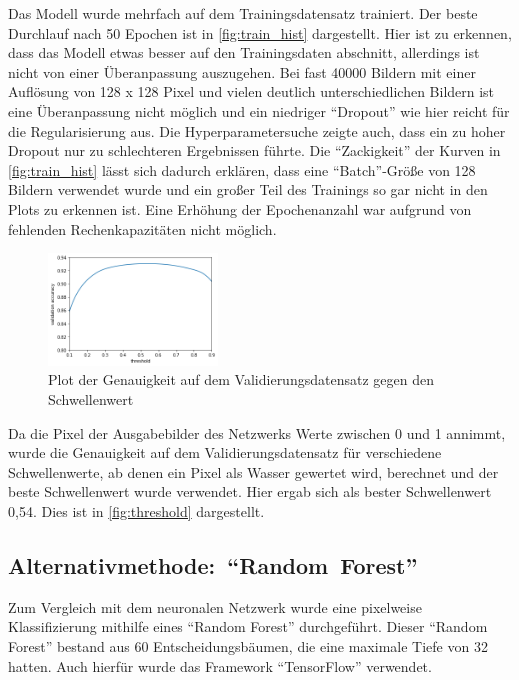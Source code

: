 Das Modell wurde mehrfach auf dem Trainingsdatensatz trainiert. 
Der beste Durchlauf nach 50 Epochen ist in \autoref{fig:train_hist} dargestellt.
Hier ist zu erkennen, dass das Modell etwas besser auf den Trainingsdaten abschnitt, allerdings ist nicht von einer Überanpassung auszugehen.
Bei fast 40000 Bildern mit einer Auflösung von 128 x 128 Pixel und vielen deutlich unterschiedlichen Bildern ist eine Überanpassung nicht möglich 
und ein niedriger \enquote{Dropout} wie hier reicht für die Regularisierung aus.
Die Hyperparametersuche zeigte auch, dass ein zu hoher Dropout nur zu schlechteren Ergebnissen führte.
Die \enquote{Zackigkeit} der Kurven in \autoref{fig:train_hist} lässt sich dadurch erklären, dass eine \enquote{Batch}-Größe von 128 Bildern verwendet wurde und ein großer Teil des Trainings so gar nicht in den Plots zu erkennen ist.
Eine Erhöhung der Epochenanzahl war aufgrund von fehlenden Rechenkapazitäten nicht möglich.


\begin{figure}
    \centering
    \includegraphics[width=0.4\textwidth]{images/threshold.png}
    \captionsetup{format=plain}
    \caption{Plot der Genauigkeit auf dem Validierungsdatensatz gegen den Schwellenwert}
    \label{fig:threshold}
\end{figure}

Da die Pixel der Ausgabebilder des Netzwerks Werte zwischen 0 und 1 annimmt, wurde die Genauigkeit auf dem Validierungsdatensatz
für verschiedene Schwellenwerte, ab denen ein Pixel als Wasser gewertet wird, berechnet und der beste Schwellenwert wurde verwendet.
Hier ergab sich als bester Schwellenwert 0,54.
Dies ist in \autoref{fig:threshold} dargestellt.

\subsection{\mbox{Alternativmethode: \enquote{Random Forest}}}
\label{ssec:Alternativmethode}

Zum Vergleich mit dem neuronalen Netzwerk wurde eine pixelweise Klassifizierung mithilfe eines \enquote{Random Forest} durchgeführt.
Dieser \enquote{Random Forest} bestand aus 60 Entscheidungsbäumen, die eine maximale Tiefe von 32 hatten.
Auch hierfür wurde das Framework \enquote{TensorFlow} verwendet.\cite{tfdf}

